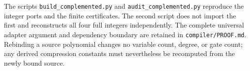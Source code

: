 The scripts \texttt{build\_complemented.py} and
\texttt{audit\_complemented.py} reproduce the integer ports and the finite
certificates.  The second script does not import the first and reconstructs
all four full integers independently.  The complete universal adapter
argument and dependency boundary are retained in
\texttt{compiler/PROOF.md}.  Rebinding a source polynomial changes no
variable count, degree, or gate count; any derived compression constants
must nevertheless be recomputed from the newly bound source.
